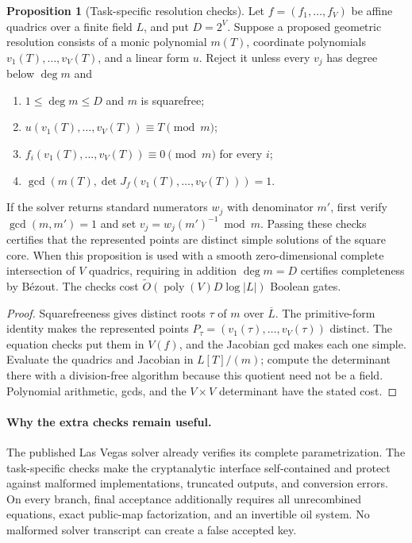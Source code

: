 \documentclass[11pt,a4paper]{article}
\theoremstyle{definition}
\newtheorem{proposition}[theorem]{Proposition}
\theoremstyle{remark}
\begin{document}
\begin{proposition}[Task-specific resolution checks]\label{prop:resolution-checks}
Let $f=(f_1,\ldots,f_V)$ be affine quadrics over a finite field $L$, and put $D=2^V$.  Suppose a proposed geometric resolution consists of a monic polynomial $m(T)$, coordinate polynomials $v_1(T),\ldots,v_V(T)$, and a linear form $u$.  Reject it unless every $v_j$ has degree below $\deg m$ and
\begin{enumerate}
\item $1\le\deg m\le D$ and $m$ is squarefree;
\item $u(v_1(T),\ldots,v_V(T))\equiv T\pmod m$;
\item $f_i(v_1(T),\ldots,v_V(T))\equiv0\pmod m$ for every $i$;
\item $\gcd\!\left(m(T),\det J_f(v_1(T),\ldots,v_V(T))\right)=1$.
\end{enumerate}
If the solver returns standard numerators $w_j$ with denominator $m'$, first verify $\gcd(m,m')=1$ and set $v_j=w_j(m')^{-1}\bmod m$.  Passing these checks certifies that the represented points are distinct simple solutions of the square core.  When this proposition is used with a smooth zero-dimensional complete intersection of $V$ quadrics, requiring in addition $\deg m=D$ certifies completeness by B\'ezout.  The checks cost $\widetilde O(\operatorname{poly}(V)D\log|L|)$ Boolean gates.
\end{proposition}

\begin{proof}
Squarefreeness gives distinct roots $\tau$ of $m$ over $\overline L$.  The primitive-form identity makes the represented points $P_\tau=(v_1(\tau),\ldots,v_V(\tau))$ distinct.  The equation checks put them in $V(f)$, and the Jacobian gcd makes each one simple.  Evaluate the quadrics and Jacobian in $L[T]/(m)$; compute the determinant there with a division-free algorithm because this quotient need not be a field.  Polynomial arithmetic, gcds, and the $V\times V$ determinant have the stated cost.
\end{proof}

\paragraph{Why the extra checks remain useful.}
The published Las Vegas solver already verifies its complete parametrization.  The task-specific checks make the cryptanalytic interface self-contained and protect against malformed implementations, truncated outputs, and conversion errors.  On every branch, final acceptance additionally requires all unrecombined equations, exact public-map factorization, and an invertible oil system.  No malformed solver transcript can create a false accepted key.
\end{document}
